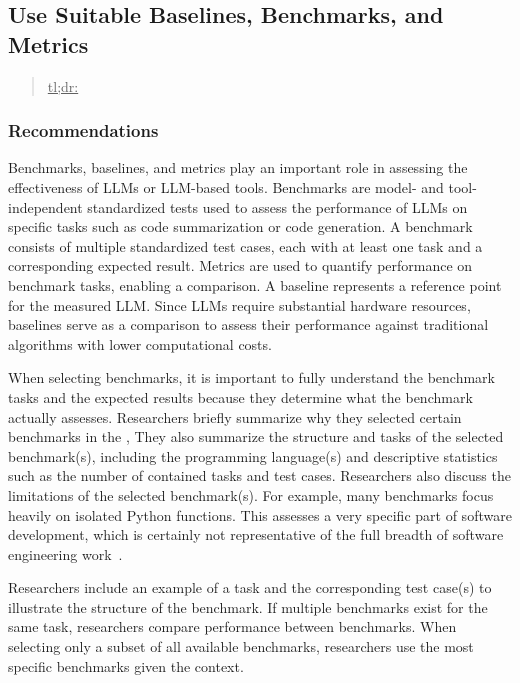 



\subsection{Use Suitable Baselines, Benchmarks, and Metrics}
\label{sec:use-suitable-baselines-benchmarks-and-metrics}

\begin{quote}
\underline{tl;dr:} 
\end{quote}

\subsubsection{Recommendations}

Benchmarks, baselines, and metrics play an important role in assessing the effectiveness of LLMs or LLM-based tools.
Benchmarks are model- and tool-independent standardized tests used to assess the performance of LLMs on specific tasks such as code summarization or code generation.
A benchmark consists of multiple standardized test cases, each with at least one task and a corresponding expected result.
Metrics are used to quantify performance on benchmark tasks, enabling a comparison.
A baseline represents a reference point for the measured LLM.
Since LLMs require substantial hardware resources, baselines serve as a comparison to assess their performance against traditional algorithms with lower computational costs.

When selecting benchmarks, it is important to fully understand the benchmark tasks and the expected results because they determine what the benchmark actually assesses.
Researchers \must briefly summarize why they selected certain benchmarks in the \paper, 
They \should also summarize the structure and tasks of the selected benchmark(s), including the programming language(s) and descriptive statistics such as the number of contained tasks and test cases.
Researchers \should also discuss the limitations of the selected benchmark(s).
For example, many benchmarks focus heavily on isolated Python functions.
This assesses a very specific part of software development, which is certainly not representative of the full breadth of software engineering work~\cite{Chandra2025benchmarks}.

Researchers \may include an example of a task and the corresponding test case(s) to illustrate the structure of the benchmark.
If multiple benchmarks exist for the same task, researchers \should compare performance between benchmarks.
When selecting only a subset of all available benchmarks, researchers \should use the most specific benchmarks given the context.

